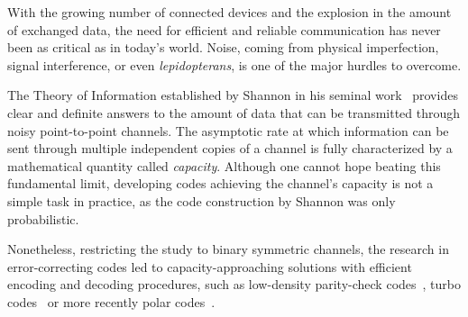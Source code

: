 
With the growing number of connected devices and the explosion in the amount of exchanged data, the need for efficient and reliable communication has never been as critical as in today's world. Noise, coming from physical imperfection, signal interference, or even \emph{lepidopterans}, is one of the major hurdles to overcome.

The Theory of Information established by Shannon in his seminal work~\cite{Shannon48} provides clear and definite answers to the amount of data that can be transmitted through noisy point-to-point channels. The asymptotic rate at which information can be sent through multiple independent copies of a channel is fully characterized by a mathematical quantity called \emph{capacity}. Although one cannot hope beating this fundamental limit, developing codes achieving the channel's capacity is not a simple task in practice, as the code construction by Shannon was only probabilistic.

Nonetheless, restricting the study to binary symmetric channels, the research in error-correcting codes led to capacity-approaching solutions with efficient encoding and decoding procedures, such as low-density parity-check codes~\cite{Gallager62}, turbo codes~\cite{BG96} or more recently polar codes~\cite{Arikan09}.


